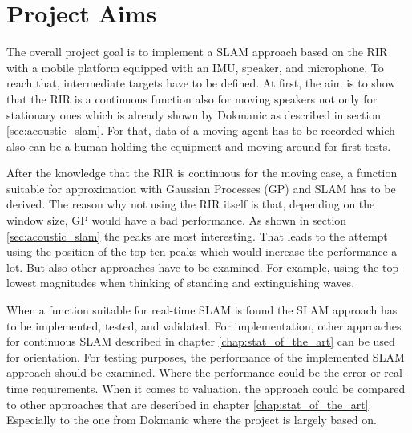 \section{Project Aims}

The overall project goal is to implement a SLAM approach based on the RIR with a mobile platform equipped with an IMU, speaker, and microphone. To reach that, intermediate targets have to be defined. At first, the aim is to show that the RIR is a continuous function also for moving speakers not only for stationary ones which is already shown by Dokmanic \cite{dokmanic_roomrecslam_2016} as described in section \ref{sec:acoustic_slam}. For that, data of a moving agent has to be recorded which also can be a human holding the equipment and moving around for first tests. 

After the knowledge that the RIR is continuous for the moving case, a function suitable for approximation with Gaussian Processes (GP) and SLAM has to be derived. The reason why not using the RIR itself is that, depending on the window size, GP would have a bad performance. As shown in section \ref{sec:acoustic_slam} the peaks are most interesting. That leads to the attempt using the position of the top ten peaks which would increase the performance a lot. But also other approaches have to be examined. For example, using the top lowest magnitudes when thinking of standing and extinguishing waves.

When a function suitable for real-time SLAM is found the SLAM approach has to be implemented, tested, and validated. For implementation, other approaches for continuous SLAM described in chapter \ref{chap:stat_of_the_art} can be used for orientation. For testing purposes, the performance of the implemented SLAM approach should be examined. Where the performance could be the error or real-time requirements. When it comes to valuation, the approach could be compared to other approaches that are described in chapter \ref{chap:stat_of_the_art}. Especially to the one from Dokmanic \cite{dokmanic_roomrecslam_2016} where the project is largely based on.
